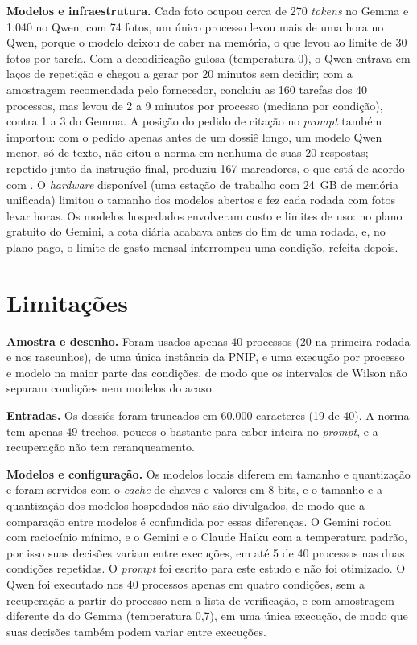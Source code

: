 \textbf{Modelos e infraestrutura.} Cada foto ocupou cerca de 270 \textit{tokens} no Gemma e 1.040 no Qwen; com 74 fotos, um único processo levou mais de uma hora no Qwen, porque o modelo deixou de caber na memória, o que levou ao limite de 30 fotos por tarefa. Com a decodificação gulosa (temperatura 0), o Qwen entrava em laços de repetição e chegou a gerar por 20 minutos sem decidir; com a amostragem recomendada pelo fornecedor, concluiu as 160 tarefas dos 40 processos, mas levou de 2 a 9 minutos por processo (mediana por condição), contra 1 a 3 do Gemma. A posição do pedido de citação no \textit{prompt} também importou: com o pedido apenas antes de um dossiê longo, um modelo Qwen menor, só de texto, não citou a norma em nenhuma de suas 20 respostas; repetido junto da instrução final, produziu 167 marcadores, o que está de acordo com . O \textit{hardware} disponível (uma estação de trabalho com 24~GB de memória unificada) limitou o tamanho dos modelos abertos e fez cada rodada com fotos levar horas. Os modelos hospedados envolveram custo e limites de uso: no plano gratuito do Gemini, a cota diária acabava antes do fim de uma rodada, e, no plano pago, o limite de gasto mensal interrompeu uma condição, refeita depois.

\section{Limitações}
\label{sec:limitacoes}

\textbf{Amostra e desenho.} Foram usados apenas 40 processos (20 na primeira rodada e nos rascunhos), de uma única instância da PNIP, e uma execução por processo e modelo na maior parte das condições, de modo que os intervalos de Wilson não separam condições nem modelos do acaso.

\textbf{Entradas.} Os dossiês foram truncados em 60.000 caracteres (19 de 40). A norma tem apenas 49 trechos, poucos o bastante para caber inteira no \textit{prompt}, e a recuperação não tem reranqueamento.

\textbf{Modelos e configuração.} Os modelos locais diferem em tamanho e quantização e foram servidos com o \textit{cache} de chaves e valores em 8 bits, e o tamanho e a quantização dos modelos hospedados não são divulgados, de modo que a comparação entre modelos é confundida por essas diferenças. O Gemini rodou com raciocínio mínimo, e o Gemini e o Claude Haiku com a temperatura padrão, por isso suas decisões variam entre execuções, em até 5 de 40 processos nas duas condições repetidas. O \textit{prompt} foi escrito para este estudo e não foi otimizado. O Qwen foi executado nos 40 processos apenas em quatro condições, sem a recuperação a partir do processo nem a lista de verificação, e com amostragem diferente da do Gemma (temperatura 0,7), em uma única execução, de modo que suas decisões também podem variar entre execuções.


